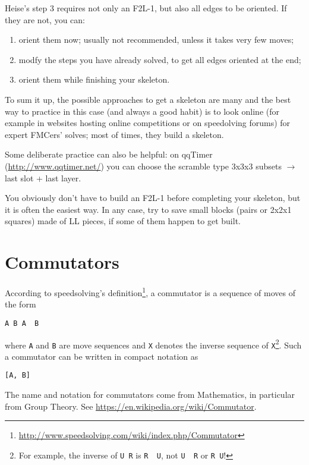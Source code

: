 \documentclass[11pt,a4paper]{book}
\newcommand{\p}{\textquotesingle}
\newcommand{\m}{\texttt}
\newcommand{\ps}{\p\,\,}
\begin{document}
Heise's step 3 requires not only an F2L-1, but also all edges to be oriented. If they are not, you can:
\begin{enumerate}
\item orient them now; usually not recommended, unless it takes very few moves;
\item modfy the steps you have already solved, to get all edges oriented at the end;
\item orient them while finishing your skeleton.
\end{enumerate}

To sum it up, the possible approaches to get a skeleton are many and the best way to practice in this case (and always a good habit) is to look online (for example in websites hosting online competitions or on speedolving forums) for expert FMCers' solves; most of times, they build a skeleton.

Some deliberate practice can also be helpful: on qqTimer (\url{http://www.qqtimer.net/}) you can choose the scramble type 3x3x3 subsets $\rightarrow$ last slot + last layer.

You obviously don't have to build an F2L-1 before completing your skeleton, but it is often the easiest way. In any case, try to save small blocks (pairs or 2x2x1 squares) made of LL pieces, if some of them happen to get built.

\section{Commutators}

According to speedsolving's definition\footnote{\url{http://www.speedsolving.com/wiki/index.php/Commutator}}, a commutator is a sequence of moves of the form

\begin{center}
\m{A B A\ps B\p}
\end{center}

where \m A and \m B are move sequences and \m{X\p} denotes the inverse sequence of \m X\footnote{For example, the inverse of \m{U R} is \m{R\ps U\p}, not \m{U\ps R\p} or \m{R U}!}. Such a commutator can be written in compact notation as

\begin{center}
\m{[A, B]}
\end{center}

The name and notation for commutators come from Mathematics, in particular from Group Theory. See \url{https://en.wikipedia.org/wiki/Commutator}.
\end{document}
